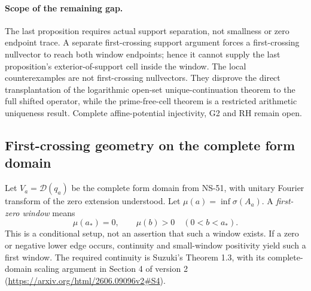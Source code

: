 \paragraph{Scope of the remaining gap.}
The last proposition requires actual support separation, not smallness
or zero endpoint trace. A separate first-crossing support argument forces
a first-crossing nullvector to reach both window endpoints; hence it
cannot supply the last proposition's exterior-of-support cell inside
the window. The local counterexamples are not first-crossing nullvectors.
They disprove the direct transplantation of the logarithmic open-set
unique-continuation theorem to the full shifted operator, while the
prime-free-cell theorem is a restricted arithmetic uniqueness result.
Complete affine-potential injectivity, G2 and RH remain open.

\subsection*{First-crossing geometry on the complete form domain}

Let $V_a=\mathcal D(q_a)$ be the complete form domain from NS-51,
with unitary Fourier transform of the zero extension understood.
Let $\mu(a)=\inf\sigma(A_a)$. A \emph{first-zero window} means
\begin{equation}\label{eq:ns55fc-first}
 \mu(a_*)=0,\qquad \mu(b)>0\quad(0<b<a_*).
\end{equation}
This is a conditional setup, not an assertion that such a window exists.
If a zero or negative lower edge occurs, continuity and small-window
positivity yield such a first window. The required continuity is
Suzuki's Theorem 1.3, with its complete-domain scaling argument in
Section 4 of version 2
(\url{https://arxiv.org/html/2606.09096v2#S4}).

